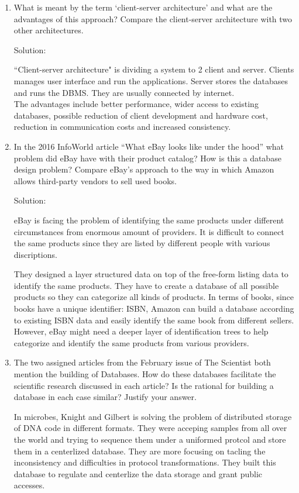\documentclass[12pt]{article}
\newcommand{\solu}{{\color{blue} Solution:}}
\begin{document}
\begin{enumerate}
        \item What is meant by the term ‘client-server architecture’ and what are the advantages of this approach? Compare the client-server architecture with two other architectures. 
        
        \solu 

        ``Client-server architecture" is dividing a system to 2 client and server. Clients manages user interface and run the applications. Server stores the databases and runs the DBMS. They are usually connected by internet.\\
        The advantages include better performance, wider access to existing databases, possible reduction of client development and hardware cost, reduction in communication costs and increased consistency.

        \item  In the 2016 InfoWorld article “What eBay looks like under the hood” what problem did eBay have with their product catalog? How is this a database design problem? Compare eBay’s approach to the way in which Amazon allows third-party vendors to sell used books.
        
        \solu

        eBay is facing the problem of identifying the same products under different circumstances from enormous amount of providers. It is difficult to connect the same products since they are listed by different people with various discriptions. 

        They designed a layer structured data on top of the free-form listing data to identify the same products. They have to create a database of all possible products so they can categorize all kinds of products. In terms of books, since books have a unique identifier: ISBN, Amazon can build a database according to existing ISBN data and easily identify the same book from different sellers. However, eBay might need a deeper layer of identification trees to help categorize and identify the same products from various providers.

        \item  The two assigned articles from the February issue of The Scientist both mention the building of Databases. How do these databases facilitate the scientific research discussed in each article? Is the rational for building a database in each case similar? Justify your answer.
        
        In microbes, Knight and Gilbert is solving the problem of distributed storage of DNA code in different formats. They were acceping samples from all over the world and trying to sequence them under a uniformed protcol and store them in a centerlized database. They are more focusing on tacling the inconsistency and difficulties in protocol transformations. They built this database to regulate and centerlize the data storage and grant public accesses.


\end{enumerate}
\end{document}
